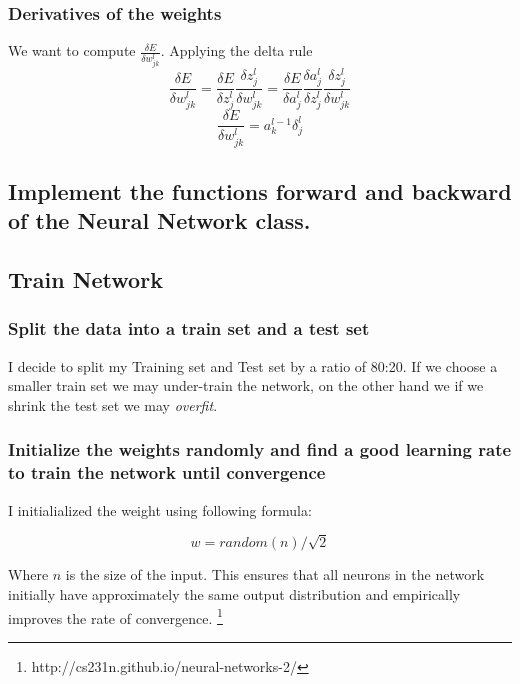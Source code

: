 \documentclass[11pt]{article}
\begin{document}
\subsubsection{Derivatives of the weights}
We want to compute $\frac{\delta E}{\delta w^l_{jk}}$. Applying the delta rule
\begin{equation}
\frac{\delta E}{\delta w^l_{jk}} = \frac{\delta E}{\delta z^l_j}\frac{\delta z^l_j}{\delta w^l_{jk}} =	
\frac{\delta E}{\delta a^l_j}\frac{\delta a^l_j}{\delta z^l_{j}}
\frac{\delta z^l_j}{\delta w^l_{jk}}
\end{equation}
\begin{equation}
\label{eq:derivativesWeigthDeltas}	
\frac{\delta E}{\delta w^l_{jk}} = a^{l-1}_k \delta^l_j
\end{equation}
\subsection{Implement the functions forward and backward of the Neural Network class.}
\subsection{Train Network}
\subsubsection{ Split the data into a train set and a test set}
I decide to split my Training set and Test set by a ratio of 80:20. If we choose a smaller train set we may under-train the network, on the other hand we if we shrink the test set we may \emph{overfit}.
\subsubsection{Initialize the weights randomly and find a good learning rate to train the network until convergence}
I initialialized the weight using following formula:

$$w = random(n)/\sqrt{2}$$

Where $n$ is the size of the input. This ensures that all neurons in the network initially have approximately the same output distribution and empirically improves the rate of convergence. \footnote{http://cs231n.github.io/neural-networks-2/}
\end{document}
